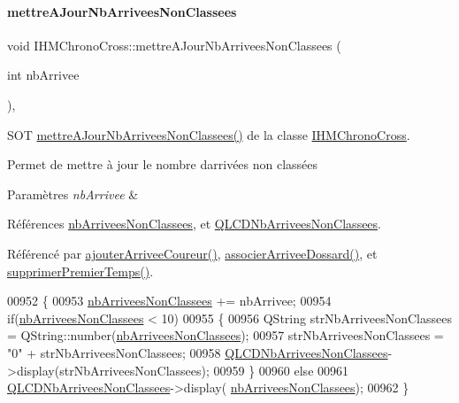 \paragraph{\texorpdfstring{mettre\+A\+Jour\+Nb\+Arrivees\+Non\+Classees}{mettreAJourNbArriveesNonClassees}}
{\footnotesize\ttfamily void I\+H\+M\+Chrono\+Cross\+::mettre\+A\+Jour\+Nb\+Arrivees\+Non\+Classees (\begin{DoxyParamCaption}\item[{int}]{nb\+Arrivee }\end{DoxyParamCaption})\hspace{0.3cm}{\ttfamily [private]}, {\ttfamily [slot]}}



S\+OT \hyperlink{class_i_h_m_chrono_cross_a1b23fda62742f2dd17652d3abcb33dd6}{mettre\+A\+Jour\+Nb\+Arrivees\+Non\+Classees()} de la classe \hyperlink{class_i_h_m_chrono_cross}{I\+H\+M\+Chrono\+Cross}. 

Permet de mettre à jour le nombre d\textquotesingle{}arrivées non classées 
\begin{DoxyParams}{Paramètres}
{\em nb\+Arrivee} & \\
\hline
\end{DoxyParams}


Références \hyperlink{class_i_h_m_chrono_cross_aa3198d36b0574b477a328621c8e1e0f0}{nb\+Arrivees\+Non\+Classees}, et \hyperlink{class_i_h_m_chrono_cross_a9cf1b999b13e69fdd0fb11ddb9011ed5}{Q\+L\+C\+D\+Nb\+Arrivees\+Non\+Classees}.



Référencé par \hyperlink{class_i_h_m_chrono_cross_a2ce63851d1f2723057ac649b7e320cfe}{ajouter\+Arrivee\+Coureur()}, \hyperlink{class_i_h_m_chrono_cross_a9f7f1ad130b60300a879694b6234f161}{associer\+Arrivee\+Dossard()}, et \hyperlink{class_i_h_m_chrono_cross_aca8b5d6683a3ab0018066ec16968f3f3}{supprimer\+Premier\+Temps()}.


\begin{DoxyCode}
00952 \{
00953     \hyperlink{class_i_h_m_chrono_cross_aa3198d36b0574b477a328621c8e1e0f0}{nbArriveesNonClassees} += nbArrivee;
00954     \textcolor{keywordflow}{if}(\hyperlink{class_i_h_m_chrono_cross_aa3198d36b0574b477a328621c8e1e0f0}{nbArriveesNonClassees} < 10)
00955     \{
00956         QString strNbArriveesNonClassees = QString::number(\hyperlink{class_i_h_m_chrono_cross_aa3198d36b0574b477a328621c8e1e0f0}{nbArriveesNonClassees});
00957         strNbArriveesNonClassees = \textcolor{stringliteral}{"0"} + strNbArriveesNonClassees;
00958         \hyperlink{class_i_h_m_chrono_cross_a9cf1b999b13e69fdd0fb11ddb9011ed5}{QLCDNbArriveesNonClassees}->display(strNbArriveesNonClassees);
00959     \}
00960     \textcolor{keywordflow}{else}
00961         \hyperlink{class_i_h_m_chrono_cross_a9cf1b999b13e69fdd0fb11ddb9011ed5}{QLCDNbArriveesNonClassees}->display(
      \hyperlink{class_i_h_m_chrono_cross_aa3198d36b0574b477a328621c8e1e0f0}{nbArriveesNonClassees});
00962 \}
\end{DoxyCode}
\mbox{\label{class_i_h_m_chrono_cross_aa272ffa273fc8c487ea64ef6a43b4439}} 
